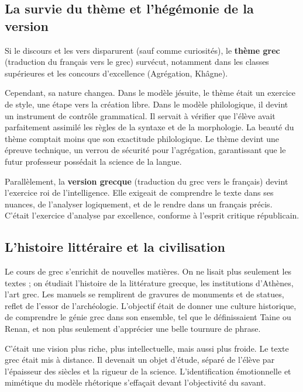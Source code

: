 \subsection{La survie du thème et l'hégémonie de la version}

Si le discours et les vers disparurent (sauf comme curiosités), le \textbf{thème grec} (traduction
du français vers le grec) survécut, notamment dans les classes supérieures et les concours
d'excellence (Agrégation, Khâgne).\cite{I-1-1-ref13}

Cependant, sa nature changea. Dans le modèle jésuite, le thème était un exercice de style, une étape
vers la création libre. Dans le modèle philologique, il devint un instrument de contrôle
grammatical. Il servait à vérifier que l'élève avait parfaitement assimilé les règles de la syntaxe
et de la morphologie. La \og beauté\fg{} du thème comptait moins que son \og exactitude\fg{}
philologique. Le thème devint une épreuve technique, un \og verrou\fg{} de sécurité pour
l'agrégation, garantissant que le futur professeur possédait la science de la
langue.\cite{I-1-1-ref11}

Parallèlement, la \textbf{version grecque} (traduction du grec vers le français) devint l'exercice
roi de l'intelligence. Elle exigeait de comprendre le texte dans ses nuances, de l'analyser
logiquement, et de le rendre dans un français précis. C'était l'exercice d'analyse par excellence,
conforme à l'esprit critique républicain.\cite{I-1-1-ref11}



\subsection{L'histoire littéraire et la civilisation}

Le cours de grec s'enrichit de nouvelles matières. On ne lisait plus seulement les textes ; on
étudiait l'histoire de la littérature grecque, les institutions d'Athènes, l'art grec. Les manuels
se remplirent de gravures de monuments et de statues, reflet de l'essor de
l'archéologie.\cite{I-1-1-ref2} L'objectif était de donner une \og culture\fg{} historique, de
comprendre le \og génie grec\fg{} dans son ensemble, tel que le définissaient Taine ou Renan, et non
plus seulement d'apprécier une belle tournure de phrase.

C'était une vision plus riche, plus intellectuelle, mais aussi plus froide. Le texte grec était mis
à distance. Il devenait un objet d'étude, séparé de l'élève par l'épaisseur des siècles et la
rigueur de la science. L'identification émotionnelle et mimétique du modèle rhétorique s'effaçait
devant l'objectivité du savant.


